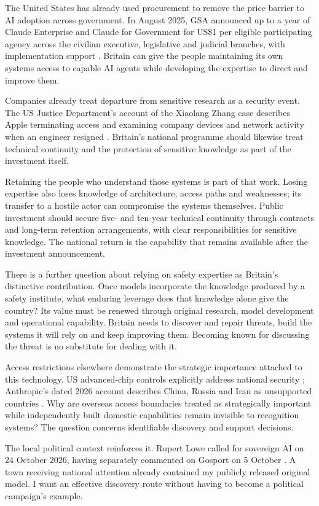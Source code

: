 The United States has already used procurement to remove the price barrier
to AI adoption across government. In August 2025, GSA announced up to a year
of Claude Enterprise and Claude for Government for US\$1 per eligible
participating agency across the civilian executive, legislative and
judicial branches, with implementation support \cite{gsaclaude2025}.
Britain can give the people maintaining its own systems access to capable
AI agents while developing the expertise to direct and improve them.

Companies already treat departure from sensitive research as a security
event. The US Justice Department's account of the Xiaolang Zhang case
describes Apple terminating access and examining company devices and
network activity when an engineer resigned \cite{applezhang2018}. Britain's
national programme should likewise treat technical continuity and the
protection of sensitive knowledge as part of the investment itself.

Retaining the people who understand those systems is part of that work.
Losing expertise also loses knowledge of architecture, access paths and
weaknesses; its transfer to a hostile actor can compromise the systems
themselves. Public investment should secure five- and ten-year technical
continuity through contracts and long-term retention arrangements, with
clear responsibilities for sensitive knowledge. The national return is
the capability that remains available after the investment announcement.

There is a further question about relying on safety expertise as Britain's
distinctive contribution. Once models incorporate the knowledge produced
by a safety institute, what enduring leverage does that knowledge alone
give the country? Its value must be renewed through original research,
model development and operational capability. Britain needs to discover
and repair threats, build the systems it will rely on and keep improving
them. Becoming known for discussing the threat is no substitute for dealing
with it.

Access restrictions elsewhere demonstrate the strategic importance attached
to this technology. US advanced-chip controls explicitly address national
security \cite{bis2024,bis2026}; Anthropic's dated 2026 account describes
China, Russia and Iran as unsupported countries \cite{anthropicregions2026}.
Why are overseas access boundaries treated as strategically important while
independently built domestic capabilities remain invisible to recognition
systems? The question concerns identifiable discovery and support decisions.

The local political context reinforces it. Rupert Lowe called for sovereign
AI on 24 October 2026, having separately commented on Gosport on 5 October
\cite{loweai,lowegosport}. A town receiving national attention already
contained my publicly released original model. I want an effective
discovery route without having to become a political campaign's example.
